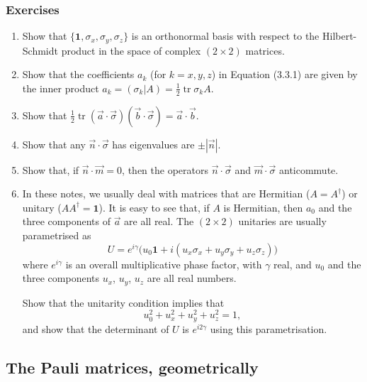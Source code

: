 \documentclass[fleqn]{article}
\begin{document}
\hypertarget{exercises-1}{%
\subsubsection{Exercises}\label{exercises-1}}

\begin{enumerate}
\def\labelenumi{\arabic{enumi}.}
\item
  Show that \(\{\mathbf{1},\sigma_x,\sigma_y,\sigma_z\}\) is an orthonormal basis with respect to the Hilbert-Schmidt product in the space of complex \((2\times 2)\) matrices.
\item
  Show that the coefficients \(a_k\) (for \(k=x,y,z\)) in Equation (3.3.1) are given by the inner product \(a_k = (\sigma_k|A) = \frac12\operatorname{tr}\sigma_k A\).
\item
  Show that \(\frac12\operatorname{tr}(\vec{a}\cdot\vec{\sigma})(\vec{b}\cdot\vec{\sigma}) = \vec{a}\cdot\vec{b}\).
\item
  Show that any \(\vec{n}\cdot\vec{\sigma}\) has eigenvalues are \(\pm|\vec{n}|\).
\item
  Show that, if \(\vec{n}\cdot\vec{m}=0\), then the operators \(\vec{n}\cdot\vec{\sigma}\) and \(\vec{m}\cdot\vec{\sigma}\) anticommute.
\item
  In these notes, we usually deal with matrices that are Hermitian (\(A=A^\dagger\)) or unitary (\(AA^\dagger=\mathbf{1}\)).
  It is easy to see that, if \(A\) is Hermitian, then \(a_0\) and the three components of \(\vec{a}\) are all real.
  The \((2\times 2)\) unitaries are usually parametrised as
  \[
     U = e^{i\gamma}\Big(u_0\mathbf{1}+ i(u_x\sigma_x + u_y\sigma_y + u_z\sigma_z)\Big)
   \]
  where \(e^{i\gamma}\) is an overall multiplicative phase factor, with \(\gamma\) real, and \(u_0\) and the three components \(u_x\), \(u_y\), \(u_z\) are all real numbers.

  Show that the unitarity condition implies that
  \[
     u_0^2 + u_x^2 + u_y^2 + u_z^2 = 1,
   \]
  and show that the determinant of \(U\) is \(e^{i2\gamma}\) using this parametrisation.
\end{enumerate}

\hypertarget{the-pauli-matrices-geometrically}{%
\subsection{The Pauli matrices, geometrically}\label{the-pauli-matrices-geometrically}}
\end{document}
